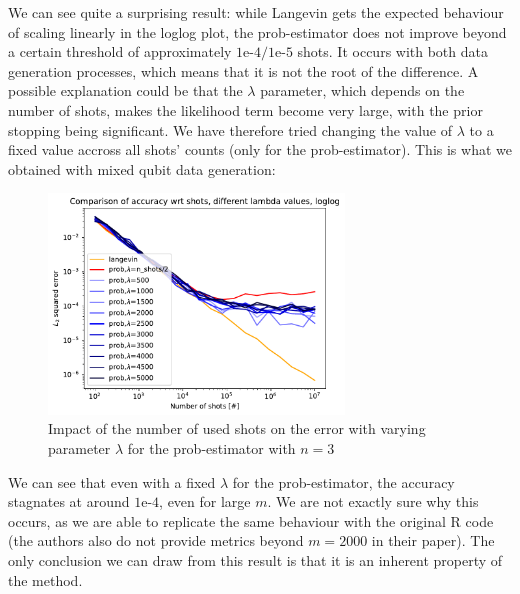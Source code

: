 \documentclass[12pt]{memoir}
\begin{document}
We can see quite a surprising result: while Langevin gets the expected behaviour of scaling linearly in the loglog plot, the prob-estimator does not improve beyond a certain threshold of approximately $1\text{e-}4/1\text{e-}5$ shots. It occurs with both data generation processes, which means that it is not the root of the difference. A possible explanation could be that the $\lambda$ parameter, which depends on the number of shots, makes the likelihood term become very large, with the prior stopping being significant. We have therefore tried changing the value of $\lambda$ to a fixed value accross all shots' counts (only for the prob-estimator). This is what we obtained with mixed qubit data generation:

\begin{figure}[H]
    \centering
    \includegraphics[width=0.7\textwidth]{figures/experiments/shots/shots_acc_comp_shots_exp_lambda_prob_with_var_lambda_loglog-1.png}
    \caption{Impact of the number of used shots on the error with varying parameter $\lambda$ for the prob-estimator with $n=3$}
    \label{fig:shots-comp-prob-var-lambda}
\end{figure}

We can see that even with a fixed $\lambda$ for the prob-estimator, the accuracy stagnates at around $1\text{e-}4$, even for large $m$. We are not exactly sure why this occurs, as we are able to replicate the same behaviour with the original R code (the authors also do not provide metrics beyond $m=2000$ in their paper). The only conclusion we can draw from this result is that it is an inherent property of the method.
\end{document}

